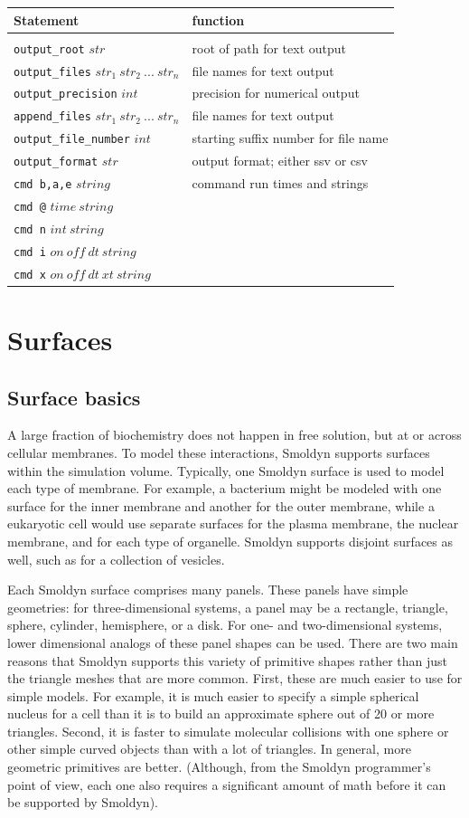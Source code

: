 \documentclass {scrbook}
\newcommand {\ttt} {\texttt}
\begin{document}
\begin{longtable}[c]{ll}
Statement & function\\
\hline\\
\ttt{output\_root} $str$ & root of path for text output\\
\ttt{output\_files} $str_1\ str_2\ ...\ str_n$ & file names for text output\\
\ttt{output\_precision} $int$ & precision for numerical output\\
\ttt{append\_files} $str_1\ str_2\ ...\ str_n$ & file names for text output\\
\ttt{output\_file\_number} $int$ & starting suffix number for file name\\
\ttt{output\_format} $str$ & output format; either ssv or csv\\
\ttt{cmd b,a,e} $string$ & command run times and strings\\
\ttt{cmd @} $time\ string$\\
\ttt{cmd n} $int\ string$\\
\ttt{cmd i} $on\ off\ dt\ string$\\
\ttt{cmd x} $on\ off\ dt\ xt\ string$
\end{longtable}


\chapter{Surfaces}

\section{Surface basics}

A large fraction of biochemistry does not happen in free solution, but at or across cellular membranes. To model these interactions, Smoldyn supports surfaces within the simulation volume. Typically, one Smoldyn surface is used to model each type of membrane. For example, a bacterium might be modeled with one surface for the inner membrane and another for the outer membrane, while a eukaryotic cell would use separate surfaces for the plasma membrane, the nuclear membrane, and for each type of organelle. Smoldyn supports disjoint surfaces as well, such as for a collection of vesicles.

Each Smoldyn surface comprises many panels. These panels have simple geometries: for three-dimensional systems, a panel may be a rectangle, triangle, sphere, cylinder, hemisphere, or a disk. For one- and two-dimensional systems, lower dimensional analogs of these panel shapes can be used. There are two main reasons that Smoldyn supports this variety of primitive shapes rather than just the triangle meshes that are more common. First, these are much easier to use for simple models. For example, it is much easier to specify a simple spherical nucleus for a cell than it is to build an approximate sphere out of 20 or more triangles. Second, it is faster to simulate molecular collisions with one sphere or other simple curved objects than with a lot of triangles. In general, more geometric primitives are better. (Although, from the Smoldyn programmer's point of view, each one also requires a significant amount of math before it can be supported by Smoldyn).
\end{document}
